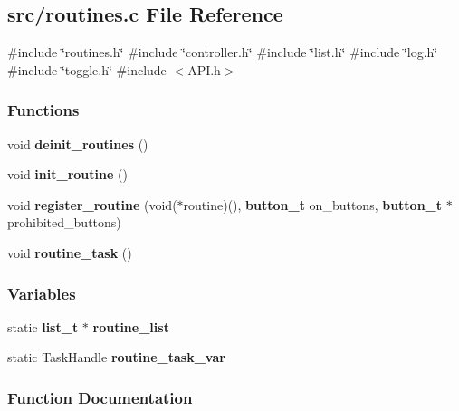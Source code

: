 \subsection{src/routines.c File Reference}
\label{a00140}
{\ttfamily \#include \char`\"{}routines.\+h\char`\"{}}\newline
{\ttfamily \#include \char`\"{}controller.\+h\char`\"{}}\newline
{\ttfamily \#include \char`\"{}list.\+h\char`\"{}}\newline
{\ttfamily \#include \char`\"{}log.\+h\char`\"{}}\newline
{\ttfamily \#include \char`\"{}toggle.\+h\char`\"{}}\newline
{\ttfamily \#include $<$A\+P\+I.\+h$>$}\newline
\subsubsection*{Functions}
\begin{DoxyCompactItemize}
\item 
void \textbf{ deinit\+\_\+routines} ()
\item 
void \textbf{ init\+\_\+routine} ()
\item 
void \textbf{ register\+\_\+routine} (void($\ast$routine)(), \textbf{ button\+\_\+t} on\+\_\+buttons, \textbf{ button\+\_\+t} $\ast$prohibited\+\_\+buttons)
\item 
void \textbf{ routine\+\_\+task} ()
\end{DoxyCompactItemize}
\subsubsection*{Variables}
\begin{DoxyCompactItemize}
\item 
static \textbf{ list\+\_\+t} $\ast$ \textbf{ routine\+\_\+list}
\item 
static Task\+Handle \textbf{ routine\+\_\+task\+\_\+var}
\end{DoxyCompactItemize}


\subsubsection{Function Documentation}
\mbox{\label{a00140_ad908adbc884189372f72f882ec62d71d}} 
